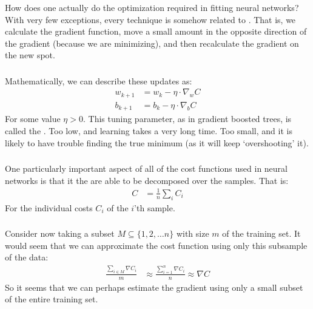 \documentclass[xetex,mathserif,serif,aspectratio=169]{beamer}
\begin{document}
\begin{frame}[fragile] \frametitle{} \oldB \small


How does one actually do the optimization required in fitting neural
networks? With very few exceptions, every technique is somehow related
to . That is, we calculate the gradient function,
move a small amount in the opposite direction of the gradient (because
we are minimizing), and then recalculate the gradient on the new spot.

\end{frame}

\begin{frame}[fragile] \frametitle{} \oldB \small


Mathematically, we can describe these updates as:
\begin{align*}
w_{k+1} &= w_k - \eta \cdot \nabla_w C \\
b_{k+1} &= b_k - \eta \cdot \nabla_b C
\end{align*}
For some value $\eta > 0$. This tuning parameter, as in gradient boosted
trees, is called the . Too low, and learning takes a
very long time. Too small, and it is likely to have trouble finding the
true minimum (as it will keep `overshooting' it).

\end{frame}

\begin{frame}[fragile] \frametitle{} \oldB \small


One particularly important aspect of all of the cost functions used in
neural networks is that it the are able to be decomposed over the samples.
That is:
\begin{align*}
C &= \frac{1}{n} \sum_i C_i
\end{align*}
For the individual costs $C_i$ of the $i$'th sample.

\end{frame}

\begin{frame}[fragile] \frametitle{} \oldB \small


Consider now taking a subset $M \subseteq \{1, 2, \ldots n \}$ with size
$m$ of the training set. It would seem that we can approximate the cost function
using only this subsample of the data:
\begin{align*}
\frac{\sum_{i \in M} \nabla C_i}{m} &\approx \frac{\sum_{i=1}^n \nabla C_i}{n} \approx \nabla C
\end{align*}
So it seems that we can perhaps estimate the gradient using only a small subset
of the entire training set.

\end{frame}
\end{document}
